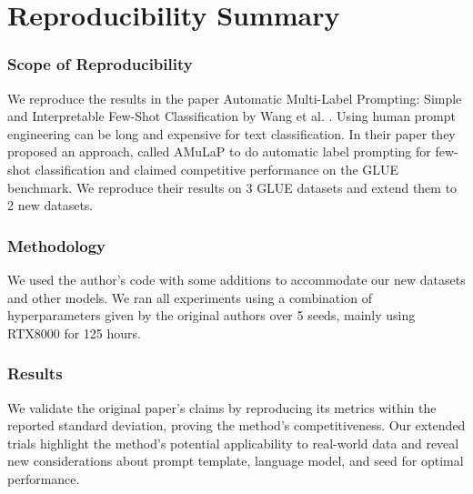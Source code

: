 \section*{\centering Reproducibility Summary}


\subsubsection*{Scope of Reproducibility}

We reproduce the results in the paper Automatic Multi-Label Prompting: Simple and Interpretable Few-Shot Classification by Wang et al. \cite{Wang}. Using human prompt engineering can be long and expensive for text classification. In their paper they proposed an approach, called AMuLaP to do automatic label prompting for few-shot classification and claimed competitive performance on the GLUE benchmark. We reproduce their results on 3 GLUE datasets and extend them to 2 new datasets. 

\subsubsection*{Methodology}

We used the author's code with some additions to accommodate our new datasets and other models. We ran all experiments using a combination of hyperparameters given by the original authors over 5 seeds, mainly using RTX8000 for 125 hours.

\subsubsection*{Results}

We validate the original paper's claims by reproducing its metrics within the reported standard deviation, proving the method's competitiveness. Our extended trials highlight the method's potential applicability to real-world data and reveal new considerations about prompt template, language model, and seed for optimal performance.

